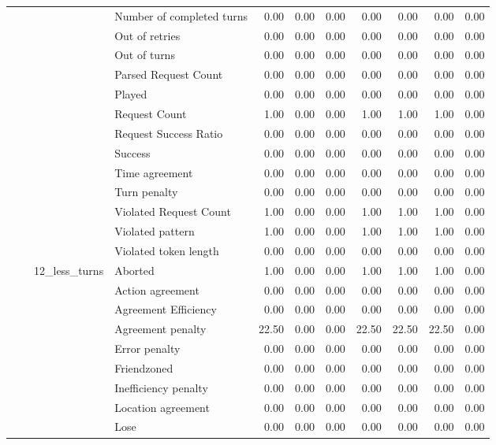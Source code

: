 \begin{tabular}{llllrrrrrrr}
 &  &  & Number of completed turns & 0.00 & 0.00 & 0.00 & 0.00 & 0.00 & 0.00 & 0.00 \\
 &  &  & Out of retries & 0.00 & 0.00 & 0.00 & 0.00 & 0.00 & 0.00 & 0.00 \\
 &  &  & Out of turns & 0.00 & 0.00 & 0.00 & 0.00 & 0.00 & 0.00 & 0.00 \\
 &  &  & Parsed Request Count & 0.00 & 0.00 & 0.00 & 0.00 & 0.00 & 0.00 & 0.00 \\
 &  &  & Played & 0.00 & 0.00 & 0.00 & 0.00 & 0.00 & 0.00 & 0.00 \\
 &  &  & Request Count & 1.00 & 0.00 & 0.00 & 1.00 & 1.00 & 1.00 & 0.00 \\
 &  &  & Request Success Ratio & 0.00 & 0.00 & 0.00 & 0.00 & 0.00 & 0.00 & 0.00 \\
 &  &  & Success & 0.00 & 0.00 & 0.00 & 0.00 & 0.00 & 0.00 & 0.00 \\
 &  &  & Time agreement & 0.00 & 0.00 & 0.00 & 0.00 & 0.00 & 0.00 & 0.00 \\
 &  &  & Turn penalty & 0.00 & 0.00 & 0.00 & 0.00 & 0.00 & 0.00 & 0.00 \\
 &  &  & Violated Request Count & 1.00 & 0.00 & 0.00 & 1.00 & 1.00 & 1.00 & 0.00 \\
 &  &  & Violated pattern & 1.00 & 0.00 & 0.00 & 1.00 & 1.00 & 1.00 & 0.00 \\
 &  &  & Violated token length & 0.00 & 0.00 & 0.00 & 0.00 & 0.00 & 0.00 & 0.00 \\
\cline{3-11}
 &  & \multirow[t]{27}{*}{12_less_turns} & Aborted & 1.00 & 0.00 & 0.00 & 1.00 & 1.00 & 1.00 & 0.00 \\
 &  &  & Action agreement & 0.00 & 0.00 & 0.00 & 0.00 & 0.00 & 0.00 & 0.00 \\
 &  &  & Agreement Efficiency & 0.00 & 0.00 & 0.00 & 0.00 & 0.00 & 0.00 & 0.00 \\
 &  &  & Agreement penalty & 22.50 & 0.00 & 0.00 & 22.50 & 22.50 & 22.50 & 0.00 \\
 &  &  & Error penalty & 0.00 & 0.00 & 0.00 & 0.00 & 0.00 & 0.00 & 0.00 \\
 &  &  & Friendzoned & 0.00 & 0.00 & 0.00 & 0.00 & 0.00 & 0.00 & 0.00 \\
 &  &  & Inefficiency penalty & 0.00 & 0.00 & 0.00 & 0.00 & 0.00 & 0.00 & 0.00 \\
 &  &  & Location agreement & 0.00 & 0.00 & 0.00 & 0.00 & 0.00 & 0.00 & 0.00 \\
 &  &  & Lose & 0.00 & 0.00 & 0.00 & 0.00 & 0.00 & 0.00 & 0.00 \\

\end{tabular}
